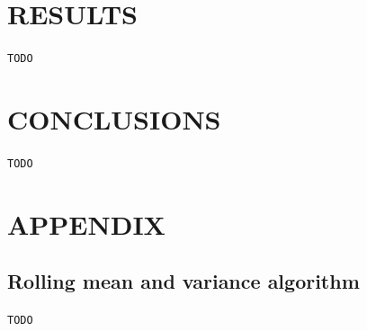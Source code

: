 \documentclass[letterpaper, 10 pt, conference]{ieeeconf}
\begin{document}
  \section{RESULTS}
  
  \verb|TODO|

  \section{CONCLUSIONS}
  
  \verb|TODO|
    
  
  \section*{APPENDIX}
  
  \subsection{Rolling mean and variance algorithm}
  \label{sub:rolling}
  
  \verb|TODO|
\end{document}
